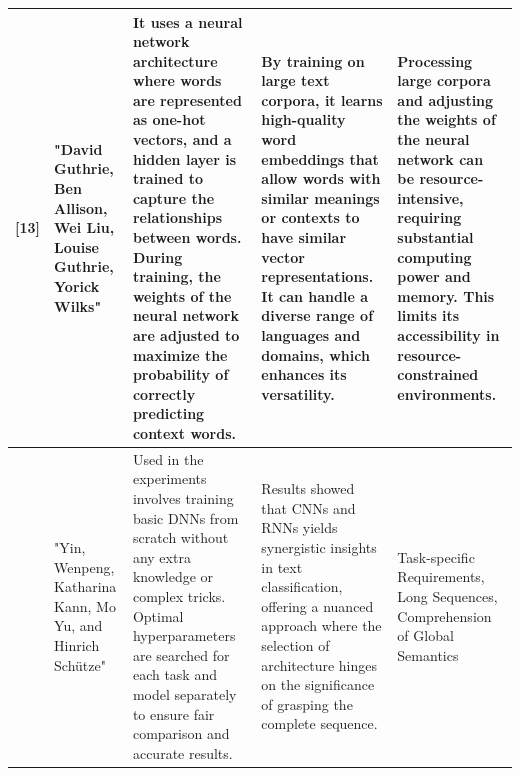 \documentclass[conference]{IEEEtran}
\begin{document}
\begin{table}
\begin{center}
\begin{tabular}{ |p{1cm}|p{2cm}|p{4cm}|p{4cm}|p{4cm}| }
[13]  & "David Guthrie, Ben Allison, Wei Liu, Louise Guthrie, Yorick Wilks" &  It uses a neural network architecture where words are represented as one-hot vectors, and a hidden layer is trained to capture the relationships between words. During training, the weights of the neural network are adjusted to maximize the probability of correctly predicting context words. &  By training on large text corpora, it learns high-quality word embeddings that allow words with similar meanings or contexts to have similar vector representations. It can handle a diverse range of languages and domains, which enhances its versatility. &  Processing large corpora and adjusting the weights of the neural network can be resource-intensive, requiring substantial computing power and memory. This limits its accessibility in resource-constrained environments.  \\
\hline
[14]  &  "Yin, Wenpeng, Katharina Kann, Mo Yu, and Hinrich Schütze" &  Used in the experiments involves training basic DNNs from scratch without any extra knowledge or complex tricks. Optimal hyperparameters are searched for each task and model separately to ensure fair comparison and accurate results. &  Results showed that CNNs and RNNs yields synergistic insights in text classification, offering a nuanced approach where the selection of architecture hinges on the significance of grasping the complete sequence. &  Task-specific Requirements, Long Sequences, Comprehension of Global Semantics  \\
\hline
\end{tabular}
\end{center}
\end{table}
\end{document}
